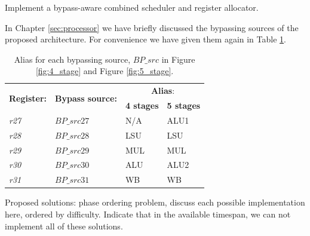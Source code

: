 Implement a bypass-aware combined scheduler and register allocator.



In Chapter \ref{sec:processor} we have briefly discussed the bypassing sources of the proposed architecture. For convenience we have given them again in Table \ref{table:bypass_alias}.

\begin{table}[H]
\caption{Alias for each bypassing source, $BP\_src$ in Figure \ref{fig:4_stage} and Figure \ref{fig:5_stage}.}
\begin{center}
\begin{tabular}{@{}llll@{}}
\toprule
\multirow{2}{*}{\textbf{Register:}} & \multirow{2}{*}{\textbf{Bypass source:}} & \multicolumn{2}{c}{\textbf{Alias}:} \\ \cline{3-4}
 & & \textbf{4 stages} & \textbf{5 stages} \\
\hline
\emph{r27} & $BP\_src27$ & N/A & ALU1 \\ 
\emph{r28} & $BP\_src28$ & LSU & LSU \\
\emph{r29} & $BP\_src29$ & MUL & MUL \\ 
\emph{r30} & $BP\_src30$ & ALU & ALU2 \\
\emph{r31} & $BP\_src31$ & WB & WB \\
\bottomrule
\end{tabular}
\end{center}
\label{table:bypass_alias}
\end{table}%



Proposed solutions: phase ordering problem, discuss each possible implementation here, ordered by difficulty. Indicate that in the available timespan, we can not implement all of these solutions.
